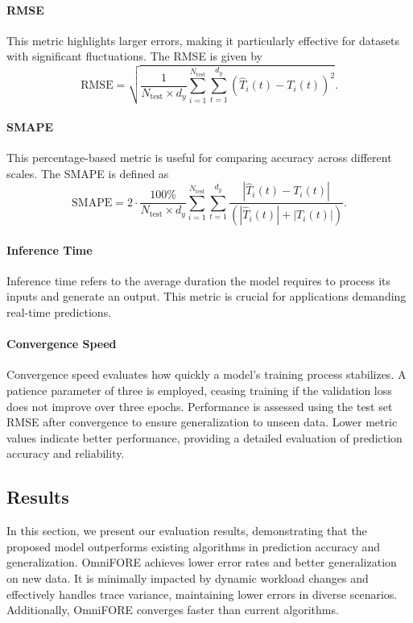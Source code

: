 \paragraph{RMSE}
This metric highlights larger errors, making it particularly effective for datasets with significant fluctuations. The \ac{RMSE} is given by
\begin{equation}
  \text{RMSE} = \sqrt{\frac{1}{N_{\text{test}} \times d_y} \sum_{i=1}^{N_{\text{test}}} \sum_{t=1}^{d_y} \left( \hat{T}_i(t) - T_i(t) \right)^2}.
\end{equation}

\paragraph{SMAPE}
This percentage-based metric is useful for comparing accuracy across different scales. The \ac{SMAPE} is defined as
\begin{equation}
  \text{SMAPE} = 2 \cdot \frac{100\%}{N_{\text{test}} \times d_y} \sum_{i=1}^{N_{\text{test}}} \sum_{t=1}^{d_y} \frac{\left| \hat{T}_i(t) - T_i(t) \right|}{\left( \left| \hat{T}_i(t) \right| + \left| T_i(t) \right| \right)}.
\end{equation}

\paragraph{Inference Time}
Inference time refers to the average duration the model requires to process its inputs and generate an output. This metric is crucial for applications demanding real-time predictions.

\paragraph{Convergence Speed}
Convergence speed evaluates how quickly a model's training process stabilizes. A patience parameter of three is employed, ceasing training if the validation loss does not improve over three epochs. Performance is assessed using the test set \ac{RMSE} after convergence to ensure generalization to unseen data. Lower metric values indicate better performance, providing a detailed evaluation of prediction accuracy and reliability.

\subsection{Results}
\label{sec:ch4_results}
In this section, we present our evaluation results, demonstrating that the proposed model outperforms existing algorithms in prediction accuracy and generalization. \ac{OmniFORE} achieves lower error rates and better generalization on new data. It is minimally impacted by dynamic workload changes and effectively handles trace variance, maintaining lower errors in diverse scenarios. Additionally, \ac{OmniFORE} converges faster than current algorithms.

